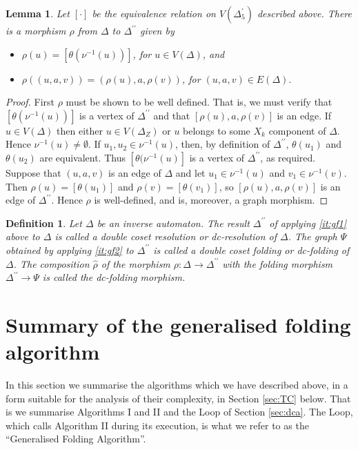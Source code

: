 \documentclass[a4paper,12pt]{article}
\newcommand{\D}{\Delta }
\renewcommand{\S}{\Sigma }
\newcommand{\nul}{\emptyset }
\newtheorem{lemma}[theorem]{Lemma}
\newtheorem{definition}[theorem]{Definition}
\numberwithin{equation}{section}
\numberwithin{figure}{section}
\newcommand{\maps}{\rightarrow}
\begin{document}
\begin{lemma}\label{lem:resol-quot}
Let $[\cdot]$ be the equivalence relation on $V(\D^\prime_5)$
described above. There is a morphism $\rho$ from  $\D$ to
$\D^{\prime\prime}$ given by
\begin{itemize}
\item
$\rho(u)=[\theta(\nu^{-1}(u))]$, for
$u\in V(\D)$, and
\item
$\rho((u,a,v))=(\rho(u),a,\rho(v))$, for $(u,a,v)\in  E(\D)$.
\end{itemize}
\end{lemma}
\begin{proof}
First $\rho$ must be shown to be well defined.
That is, we must verify that $[\theta(\nu^{-1}(u))]$ is a vertex of
$\D^{\prime\prime}$ and that $[\rho(u),a,\rho(v)]$ is an edge.
If $u \in V(\D)$
then either $u\in V(\D_Z)$ or  $u$ belongs to
some $X_k$ component of $\D$. Hence
 $\nu^{-1}(u)\neq \nul$. If $u_1, u_2\in \nu^{-1}(u)$, then,
by definition of
$\D^{\prime\prime}$, $\theta(u_1)$ and $\theta(u_2)$ are equivalent.
Thus $[\theta(\nu^{-1}(u)]$ is a vertex of $\D^{\prime\prime}$,
as required.
 Suppose that $(u,a,v)$ is an edge
of $\D$ and let $u_1\in \nu^{-1}(u)$ and $v_1\in \nu^{-1}(v)$. Then
$\rho(u)=[\theta(u_1)]$ and $\rho(v)=[\theta(v_1)]$, so
$[\rho(u), a, \rho(v)]$ is an edge of $\D^{\prime\prime}$.
Hence $\rho$ is well-defined, and is, moreover, a graph morphism.
\end{proof}


\begin{definition}
Let $\D$ be an inverse automaton.
 The result $\D^{\prime\prime}$ of applying  \ref{it:gf1}
above to $\D$ is called a \emph{double coset resolution} or
\emph{dc-resolution} of $\D$. The graph $\Psi$ obtained by applying
 \ref{it:gf2} to $\D^{\prime\prime}$ is called a \emph{double
coset folding} or \emph{dc-folding} of $\D$.  The composition $\hat\rho$ of
the  morphism
$\rho:\D\maps \D^{\prime\prime}$ with the folding morphism $\D^{\prime\prime}\maps
\Psi$ is called the \emph{dc-folding morphism}.
\end{definition}
\section{Summary of the generalised folding algorithm}
In this section we summarise the algorithms which we have described above,
in a form suitable for the analysis of their complexity, 
in Section \ref{sec:TC} below. That is we summarise Algorithms I and II
and the Loop of Section \ref{sec:dca}. The Loop, which calls Algorithm II 
during its execution, is what we refer to as the ``Generalised Folding 
Algorithm''.  
\end{document}
